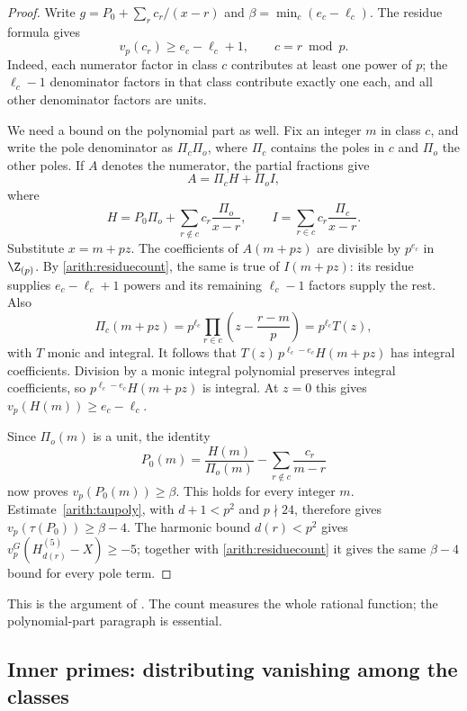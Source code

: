 \begin{proof}
Write $g=P_0+\sum_r c_r/(x-r)$ and
$\beta=\min_c(e_c-\ell_c)$.
The residue formula gives
\begin{equation}\label{arith:residuecount}
 v_p(c_r)\ge e_c-\ell_c+1,\qquad c=r\bmod p.
\end{equation}
Indeed, each numerator factor in class $c$ contributes at least one
power of $p$; the $\ell_c-1$ denominator factors in that class
contribute exactly one each, and all other denominator factors are units.

We need a bound on the polynomial part as well. Fix an integer $m$
in class $c$, and write the pole denominator as $\Pi_c\Pi_o$,
where $\Pi_c$ contains the poles in $c$ and $\Pi_o$ the other poles.
If $A$ denotes the numerator, the partial fractions give
\[
 A=\Pi_c H+\Pi_o I,
\]
where
\[
 H=P_0\Pi_o+\sum_{r\notin c}c_r\frac{\Pi_o}{x-r},
 \qquad
 I=\sum_{r\in c}c_r\frac{\Pi_c}{x-r}.
\]
Substitute $x=m+pz$. The coefficients of $A(m+pz)$ are divisible
by $p^{e_c}$ in $\Z_{(p)}$.
By \eqref{arith:residuecount}, the same is true of $I(m+pz)$:
its residue supplies $e_c-\ell_c+1$ powers and its remaining
$\ell_c-1$ factors supply the rest. Also
\[
 \Pi_c(m+pz)=p^{\ell_c}
       \prod_{r\in c}\left(z-\frac{r-m}{p}\right)=p^{\ell_c}T(z),
\]
with $T$ monic and integral. It follows that
$T(z)\,p^{\ell_c-e_c}H(m+pz)$ has integral coefficients.
Division by a monic integral polynomial preserves integral
coefficients, so $p^{\ell_c-e_c}H(m+pz)$ is integral. At $z=0$
this gives $v_p(H(m))\ge e_c-\ell_c$.

Since $\Pi_o(m)$ is a unit, the identity
\[
 P_0(m)=\frac{H(m)}{\Pi_o(m)}
              -\sum_{r\notin c}\frac{c_r}{m-r}
\]
now proves $v_p(P_0(m))\ge\beta$. This holds for every integer $m$.
Estimate~\eqref{arith:taupoly}, with $d+1<p^2$ and $p\nmid24$,
therefore gives $v_p(\tau(P_0))\ge\beta-4$.
The harmonic bound $d(r)<p^2$ gives
$v_p^G(H_{d(r)}^{(5)}-X)\ge-5$; together with
\eqref{arith:residuecount} it gives the same $\beta-4$ bound
for every pole term.
\end{proof}

This is the argument of
\cite[\texttt{DirectBound.lean}, \texttt{DirectPoly.lean},
\texttt{tauX\_direct}]{firsching}. The count measures the whole
rational function; the polynomial-part paragraph is essential.

\subsection{Inner primes: distributing vanishing among the classes}

